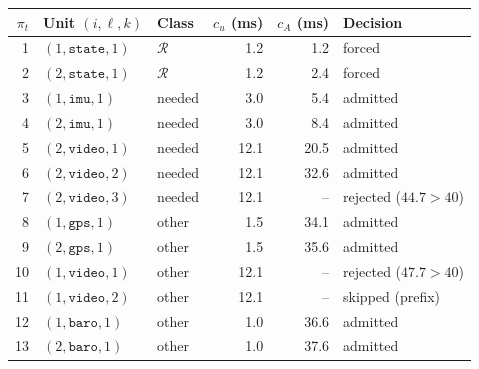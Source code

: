 \begin{tabular}{@{}rllrrl@{}}
\toprule
$\pi_t$ & Unit $(i,\ell,k)$ & Class & $c_u$ (ms) & $c_A$ (ms) & Decision \\
\midrule
1 & $(1,\texttt{state},1)$ & $\mathcal{R}$ & 1.2 & 1.2 & forced \\
2 & $(2,\texttt{state},1)$ & $\mathcal{R}$ & 1.2 & 2.4 & forced \\
3 & $(1,\texttt{imu},1)$ & needed & 3.0 & 5.4 & admitted \\
4 & $(2,\texttt{imu},1)$ & needed & 3.0 & 8.4 & admitted \\
5 & $(2,\texttt{video},1)$ & needed & 12.1 & 20.5 & admitted \\
6 & $(2,\texttt{video},2)$ & needed & 12.1 & 32.6 & admitted \\
7 & $(2,\texttt{video},3)$ & needed & 12.1 & -- & rejected ($44.7 > 40$) \\
8 & $(1,\texttt{gps},1)$ & other & 1.5 & 34.1 & admitted \\
9 & $(2,\texttt{gps},1)$ & other & 1.5 & 35.6 & admitted \\
10 & $(1,\texttt{video},1)$ & other & 12.1 & -- & rejected ($47.7 > 40$) \\
11 & $(1,\texttt{video},2)$ & other & 12.1 & -- & skipped (prefix) \\
12 & $(1,\texttt{baro},1)$ & other & 1.0 & 36.6 & admitted \\
13 & $(2,\texttt{baro},1)$ & other & 1.0 & 37.6 & admitted \\
\bottomrule
\end{tabular}

